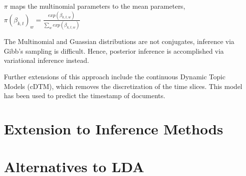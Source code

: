\documentclass[letterpaper]{article}
\begin{document}
$\pi$ maps the multinomial parameters to the mean parameters,
$\pi\left( \beta_{k,t} \right)_w = \frac{exp(\beta_{k,t,w})}{\sum_w exp\left( \beta_{k,t,w} \right)}$

The Multinomial and Guassian distributions are not conjugates,
inference via Gibb's sampling is difficult. Hence, posterior
inference is accomplished via variational inference instead.

Further extensions of this approach include the continuous Dynamic
Topic Models (cDTM), which removes the discretization of the time
slices. \citep{wang-2012-contin-time} This model has been used to
predict the timestamp of documents.
\section{Extension to Inference Methods}
\label{sec:ext:inference}

\section{Alternatives to LDA}

\end{document}
